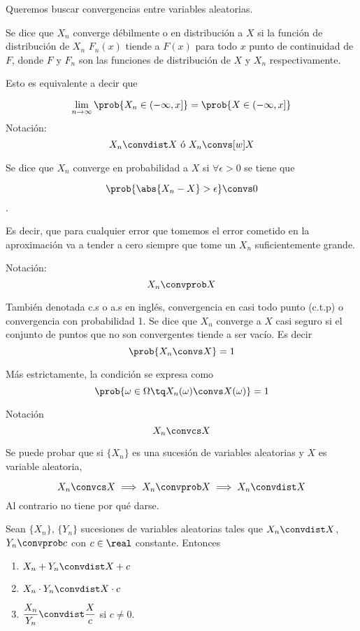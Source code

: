 \documentclass{apuntes}
\begin{document}
Queremos buscar convergencias entre variables aleatorias.

\begin{defn}

Se dice que $X_n$ converge débilmente o en distribución a $X$ si la función de distribución de $X_n$ $F_n(x)$ tiende a $F(x)$ para todo $x$ punto de continuidad de $F$, donde $F$ y $F_n$ son las funciones de distribución de $X$ y $X_n$ respectivamente.

Esto es equivalente a decir que  

\[\lim_{n\to\infty} \prob{X_n\in (-\infty, x]} = \prob{X\in (-\infty, x]} \]
Notación:
\[ X_n  \convdist X \text{ ó }  X_n \convs[w] X \] 
\end{defn}

\begin{defn} 
Se dice que $X_n$ converge en probabilidad a $X$ si $\forall \epsilon > 0$ se tiene que 

\[\prob{\abs{X_n-X} > \epsilon} \convs 0 \].

 Es decir, que para cualquier error que tomemos el error cometido en la aproximación va a tender a cero siempre que tome un $X_n$ suficientemente grande.

Notación: \[ X_n \convprob X \]
\end{defn}

\begin{defn} También denotada c.s o a.s en inglés, convergencia en casi todo punto (c.t.p) o convergencia con probabilidad 1. Se dice que $X_n$ converge a $X$ casi seguro si el conjunto de puntos que no son convergentes tiende a ser vacío. Es decir \[ \prob{X_n \convs X} = 1\]

Más estrictamente, la condición se expresa como \[\prob{\omega \in \Omega\tq X_n(\omega) \convs X(\omega)} = 1\]

Notación \[ X_n\convcs X \]
\end{defn}


\begin{theorem}Se puede probar que si $\{X_n\}$ es una sucesión de variables aleatorias y $X$ es variable aleatoria, 

\[ X_n\convcs X \implies X_n \convprob X \implies X_n \convdist X \]
Al contrario no tiene por qué darse.
\end{theorem}


\begin{theorem}\label{thmSlutsky} Sean $\{X_n\}$, $\{Y_n\}$ sucesiones de variables aleatorias tales que $X_n\convdist X$, $Y_n\convprob c$ con $c\in\real$ constante. Entonces

\begin{enumerate}
\item $X_n + Y_n \convdist X + c$
\item $X_n \cdot Y_n \convdist X \cdot c$
\item $\dfrac{X_n}{Y_n}\convdist \dfrac{X}{c}$ si $c≠0$.
\end{enumerate}
\end{theorem}
\end{document}
